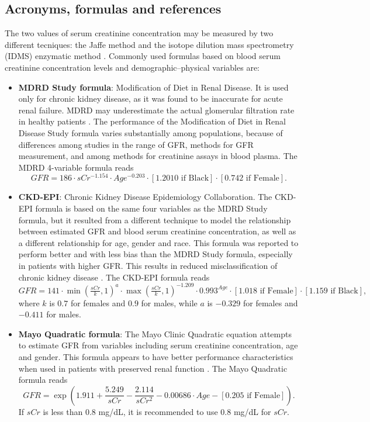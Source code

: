 \documentclass[10pt,final]{siamltex}
\begin{document}
\subsection{Acronyms, formulas and references}
%
The two values of serum creatinine concentration may be measured by two different tecniques: the Jaffe  method \cite{jaffe} and the isotope dilution mass spectrometry (IDMS) enzymatic method \cite{idms}. Commonly used formulas based on blood serum creatinine concentration levels and demographic--physical variables are:
%
\begin{itemize}
\item \textbf{MDRD Study formula}: Modification of Diet in Renal Disease. It is used only for chronic kidney disease, as it was found to be inaccurate for acute renal failure. MDRD may underestimate the actual glomerular filtration rate in healthy patients \cite{MDRD,mayo}. The performance of the Modification of Diet in Renal Disease Study formula varies substantially among populations, because of differences among studies in the range of GFR, methods for GFR measurement, and among methods for creatinine assays in blood plasma. The MDRD 4-variable formula reads
%
\begin{equation}
 \mathit{GFR} = 186 \cdot sCr^{-1.154}\cdot Age^{-0.203} \cdot [1.2010 \text{ if Black}] \cdot [0.742 \text{ if Female}].
\end{equation}
%

\item \textbf{CKD-EPI}: Chronic Kidney Disease Epidemiology Collaboration. The CKD-EPI formula is based on the same four variables as the MDRD Study formula, but it resulted from a different technique to model the relationship between estimated GFR and blood serum creatinine concentration, as well as a different relationship for age, gender and race. This formula was reported to perform better and with less bias than the MDRD Study formula, especially in patients with higher GFR. This results in reduced misclassification of chronic kidney disease \cite{ckdepi}. The CKD-EPI formula reads
%
\begin{equation}
 \mathit{GFR} =141 \cdot \min\left(\tfrac{sCr}{k},1\right)^a\cdot \max\left(\tfrac{sCr}{k},1\right)^{-1.209}\cdot0.993^{Age}\cdot [1.018 \text{ if Female}] \cdot [1.159 \text{ if Black}],
\end{equation}
%
where $k$ is $0.7$ for females and $0.9$ for males, while $a$ is $−0.329$ for females and $−0.411$ for males.

\item \textbf{Mayo Quadratic formula}: The Mayo Clinic Quadratic equation attempts to estimate GFR from variables including serum creatinine concentration, age and gender. This formula appears to have better performance characteristics when used in patients with preserved renal function \cite{rigalleau,mayo}. The Mayo Quadratic formula reads
%
\begin{equation}
\textit{GFR} = \exp\left(1.911+\frac{5.249}{sCr}-\frac{2.114}{sCr^2}-0.00686\cdot Age - [0.205 \text{ if Female}]\right).
\end{equation}
%
If $sCr$ is less than $0.8$ mg/dL, it is recommended to use $0.8$ mg/dL for $sCr$.


\end{itemize}
\end{document}
